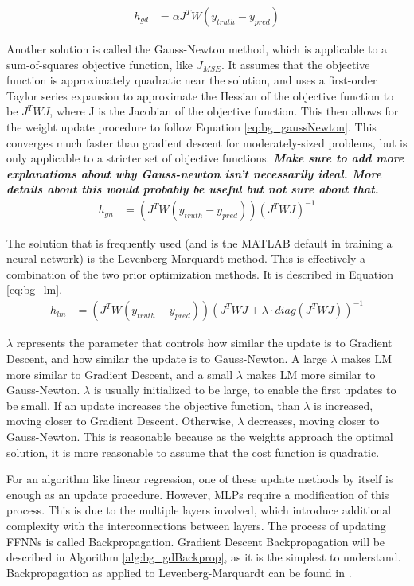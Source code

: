 	\begin{align}
		h_{gd} &= \alpha J^T W(y_{truth}-y_{pred}) \label{eq:bg_gradDescent}
	\end{align}
	\par Another solution is called the Gauss-Newton method, which is applicable to a sum-of-squares objective function, like $J_{MSE}$. It assumes that the objective function is approximately quadratic near the solution, and uses a first-order Taylor series expansion to approximate the Hessian of the objective function to be $J^TWJ$, where J is the Jacobian of the objective function. This then allows for the weight update procedure to follow Equation \ref{eq:bg_gaussNewton}. This converges much faster than gradient descent for moderately-sized problems, but is only applicable to a stricter set of objective functions. \textbf{\textit{Make sure to add more explanations about why Gauss-newton isn't necessarily ideal. More details about this would probably be useful but not sure about that.}}
	\begin{align}
		h_{gn} &= (J^TW(y_{truth}-y_{pred}))(J^T WJ)^{-1} \label{eq:bg_gaussNewton}
	\end{align}
	\par The solution that is frequently used (and is the MATLAB default in training a neural network) is the Levenberg-Marquardt method. This is effectively a combination of the two prior optimization methods. It is described in Equation \ref{eq:bg_lm}. 
	\begin{align}
		h_{lm} &= (J^TW(y_{truth}-y_{pred}))(J^T WJ + \lambda \cdot diag(J^T WJ))^{-1} \label{eq:bg_lm}
	\end{align}
	\par $\lambda$ represents the parameter that controls how similar the update is to Gradient Descent, and how similar the update is to Gauss-Newton. A large $\lambda$ makes LM more similar to Gradient Descent, and a small $\lambda$ makes LM more similar to Gauss-Newton. $\lambda$ is usually initialized to be large, to enable the first updates to be small. If an update increases the objective function, than $\lambda$ is increased, moving closer to Gradient Descent. Otherwise, $\lambda$ decreases, moving closer to Gauss-Newton. This is reasonable because as the weights approach the optimal solution, it is more reasonable to assume that the cost function is quadratic.
	\par For an algorithm like linear regression, one of these update methods by itself is enough as an update procedure. However, MLPs require a modification of this process. This is due to the multiple layers involved, which introduce additional complexity with the interconnections between layers. The process of updating FFNNs is called Backpropagation. Gradient Descent Backpropagation will be described in Algorithm \ref{alg:bg_gdBackprop}, as it is the simplest to understand. Backpropagation as applied to Levenberg-Marquardt can be found in \cite{lm-backprop}.
